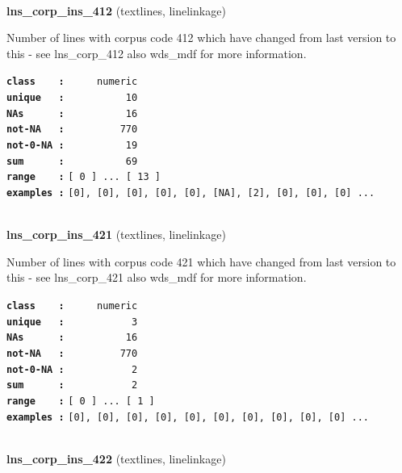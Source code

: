 \documentclass[]{article}
\begin{document}
~

\textbf{lns\_corp\_ins\_412} (textlines, linelinkage)

Number of lines with corpus code 412 which have changed from last
version to this - see lns\_corp\_412 also wds\_mdf for more information.

\textbf{\texttt{class\ \ \ \ :}} \texttt{~~~~~numeric}\\
\textbf{\texttt{unique\ \ \ :}} \texttt{~~~~~~~~~~10}\\
\textbf{\texttt{NAs\ \ \ \ \ \ :}} \texttt{~~~~~~~~~~16}\\
\textbf{\texttt{not-NA\ \ \ :}} \texttt{~~~~~~~~~770}\\
\textbf{\texttt{not-0-NA\ :}} \texttt{~~~~~~~~~~19}\\
\textbf{\texttt{sum\ \ \ \ \ \ :}} \texttt{~~~~~~~~~~69}\\
\textbf{\texttt{range\ \ \ \ :}}
\texttt{{[}\ 0\ {]}\ ...\ {[}\ 13\ {]}}\\
\textbf{\texttt{examples\ :}}
\texttt{{[}0{]},\ {[}0{]},\ {[}0{]},\ {[}0{]},\ {[}0{]},\ {[}NA{]},\ {[}2{]},\ {[}0{]},\ {[}0{]},\ {[}0{]}\ ...}\\

~

\textbf{lns\_corp\_ins\_421} (textlines, linelinkage)

Number of lines with corpus code 421 which have changed from last
version to this - see lns\_corp\_421 also wds\_mdf for more information.

\textbf{\texttt{class\ \ \ \ :}} \texttt{~~~~~numeric}\\
\textbf{\texttt{unique\ \ \ :}} \texttt{~~~~~~~~~~~3}\\
\textbf{\texttt{NAs\ \ \ \ \ \ :}} \texttt{~~~~~~~~~~16}\\
\textbf{\texttt{not-NA\ \ \ :}} \texttt{~~~~~~~~~770}\\
\textbf{\texttt{not-0-NA\ :}} \texttt{~~~~~~~~~~~2}\\
\textbf{\texttt{sum\ \ \ \ \ \ :}} \texttt{~~~~~~~~~~~2}\\
\textbf{\texttt{range\ \ \ \ :}}
\texttt{{[}\ 0\ {]}\ ...\ {[}\ 1\ {]}}\\
\textbf{\texttt{examples\ :}}
\texttt{{[}0{]},\ {[}0{]},\ {[}0{]},\ {[}0{]},\ {[}0{]},\ {[}0{]},\ {[}0{]},\ {[}0{]},\ {[}0{]},\ {[}0{]}\ ...}\\

~

\textbf{lns\_corp\_ins\_422} (textlines, linelinkage)
\end{document}
